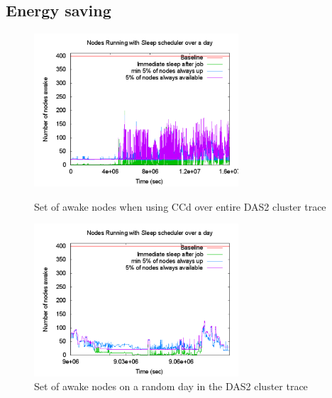 \subsection{Energy saving} %
\label{sub:energy_saving}
\begin{figure}[ht]
\centering
\begin{minipage}{\linewidth}
\begin{center}
\includegraphics[width=3.0in]{graphs/nodesup1.pdf}
\vspace{-0.1in}
\caption{{\normalsize Set of awake nodes when using CCd over entire  DAS2 cluster trace} \label{fig:nodesup}}
\end{center}
\end{minipage}
\begin{minipage}{\linewidth}
\begin{center}
\includegraphics[width=3.0in]{graphs/nodesup-zoomed1.pdf}
\vspace{-0.1in}
\caption{{\normalsize Set of awake nodes on a random day in the DAS2 cluster trace} \label{fig:nodesup-zoomed}}
\vspace{-0.1in}
\end{center}
\end{minipage}
\end{figure}

